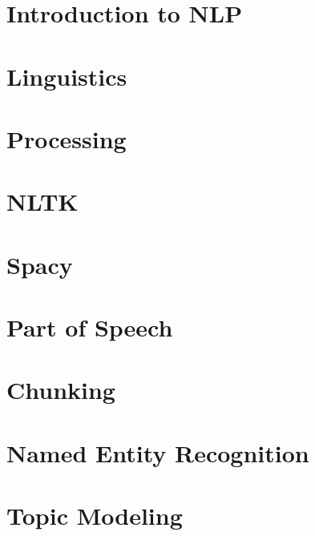 \section[Intro]{Introduction to NLP}


\section[Ling]{Linguistics}

\section[Pre]{Processing}

\section[NLTK]{NLTK}


\section[Spacy]{Spacy}


\section[POS]{Part of Speech}





\section[Chunk]{Chunking}



\section[NER]{Named Entity Recognition}




\section[Topics]{Topic Modeling}


